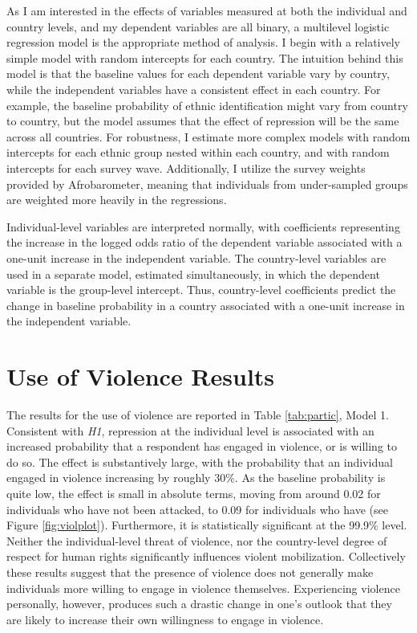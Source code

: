 \documentclass[12pt,]{book}
\theoremstyle{definition}
\theoremstyle{definition}
\theoremstyle{definition}
\theoremstyle{remark}
\begin{document}
As I am interested in the effects of variables measured at both the
individual and country levels, and my dependent variables are all
binary, a multilevel logistic regression model is the appropriate method
of analysis. I begin with a relatively simple model with random
intercepts for each country. The intuition behind this model is that the
baseline values for each dependent variable vary by country, while the
independent variables have a consistent effect in each country. For
example, the baseline probability of ethnic identification might vary
from country to country, but the model assumes that the effect of
repression will be the same across all countries. For robustness, I
estimate more complex models with random intercepts for each ethnic
group nested within each country, and with random intercepts for each
survey wave. Additionally, I utilize the survey weights provided by
Afrobarometer, meaning that individuals from under-sampled groups are
weighted more heavily in the regressions.

Individual-level variables are interpreted normally, with coefficients
representing the increase in the logged odds ratio of the dependent
variable associated with a one-unit increase in the independent
variable. The country-level variables are used in a separate model,
estimated simultaneously, in which the dependent variable is the
group-level intercept. Thus, country-level coefficients predict the
change in baseline probability in a country associated with a one-unit
increase in the independent variable.

\hypertarget{use-of-violence-results}{%
\section{Use of Violence Results}\label{use-of-violence-results}}

The results for the use of violence are reported in Table
\ref{tab:partic}, Model 1. Consistent with \emph{H1}, repression at the
individual level is associated with an increased probability that a
respondent has engaged in violence, or is willing to do so. The effect
is substantively large, with the probability that an individual engaged
in violence increasing by roughly 30\%. As the baseline probability is
quite low, the effect is small in absolute terms, moving from around
0.02 for individuals who have not been attacked, to 0.09 for individuals
who have (see Figure \ref{fig:violplot}). Furthermore, it is
statistically significant at the 99.9\% level. Neither the
individual-level threat of violence, nor the country-level degree of
respect for human rights significantly influences violent mobilization.
Collectively these results suggest that the presence of violence does
not generally make individuals more willing to engage in violence
themselves. Experiencing violence personally, however, produces such a
drastic change in one's outlook that they are likely to increase their
own willingness to engage in violence.
\end{document}
